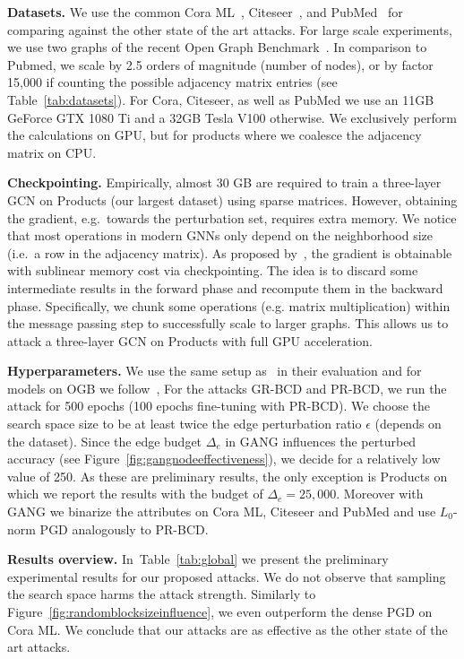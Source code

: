 \documentclass[sigconf,authordraft]{acmart}
\begin{document}
\textbf{Datasets.} We use the common Cora ML~\citep{Bojchevski2018}, Citeseer~\citep{McCallum2000}, and PubMed~\citep{Sen2008} for comparing against the other state of the art attacks. For large scale experiments, we use two graphs of the recent Open Graph Benchmark~\citep{Hu2020}. In comparison to Pubmed, we scale by 2.5 orders of magnitude (number of nodes), or by factor 15,000 if counting the possible adjacency matrix entries (see Table~\ref{tab:datasets}). For Cora, Citeseer, as well as PubMed we use an 11GB GeForce GTX 1080 Ti and a 32GB Tesla V100 otherwise. We exclusively perform the calculations on GPU, but for products where we coalesce the adjacency matrix on CPU.

\textbf{Checkpointing.} Empirically, almost 30 GB are required to train a three-layer GCN on Products (our largest dataset) using sparse matrices. However, obtaining the gradient, e.g.\ towards the perturbation set, requires extra memory. We notice that most operations in modern GNNs only depend on the neighborhood size (i.e.~a row in the adjacency matrix). As proposed by~\citet{Chen2016}, the gradient is obtainable with sublinear memory cost via checkpointing. The idea is to discard some intermediate results in the forward phase and recompute them in the backward phase. Specifically, we chunk some operations (e.g. matrix multiplication) within the message passing step to successfully scale to larger graphs. This allows us to attack a three-layer GCN on Products with full GPU acceleration.

\textbf{Hyperparameters.} We use the same setup as~\citet{Geisler2020} in their evaluation and for models on OGB we follow~\citet{Hu2020}, For the attacks GR-BCD and PR-BCD, we run the attack for 500 epochs (100 epochs fine-tuning with PR-BCD). We choose the search space size to be at least twice the edge perturbation ratio \(\epsilon\) (depends on the dataset). Since the edge budget \(\Delta_e\) in GANG influences the perturbed accuracy (see Figure~\ref{fig:gangnodeeffectiveness}), we decide for a relatively low value of 250. As these are preliminary results, the only exception is Products on which we report the results with the budget of \(\Delta_e=25,000\). Moreover with GANG we binarize the attributes on Cora ML, Citeseer and PubMed and use \(L_0\)-norm PGD analogously to PR-BCD.

\textbf{Results overview.} In~Table~\ref{tab:global} we present the preliminary experimental results for our proposed attacks. We do not observe that sampling the search space harms the attack strength. Similarly to Figure~\ref{fig:randomblocksizeinfluence}, we even outperform the dense PGD on Cora ML. We conclude that our attacks are as effective as the other state of the art attacks.
\end{document}
